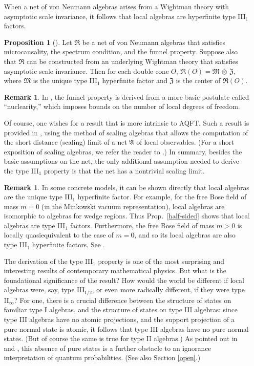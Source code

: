 \documentclass[11pt]{article}
\newcommand{\alg}[1]{\mathfrak{#1}}
\theoremstyle{definition}
\newtheorem{prop}[thm]{Proposition}
\theoremstyle{definition}
\newtheorem{note}[thm]{Remark}
\theoremstyle{remark}
\def\al#1{{\mathfrak #1}}
\begin{document}
When a net of von Neumann algebras arises from a Wightman theory with
asymptotic scale invariance, it follows that local algebras are
hyperfinite type III$_1$ factors.

\begin{prop}[\cite{typeIII}] Let $\al R$ be a net of von Neumann
  algebras that satisfies microcausality, the spectrum condition, and
  the funnel property.  Suppose also that $\al R$ can be constructed
  from an underlying Wightman theory that satisfies asymptotic scale
  invariance.  Then for each double cone $O$, $\al R (O)=\al
  M\,\overline{\otimes}\,\al Z$, where $\al M$ is the unique type
  III$_1$ hyperfinite factor and $\al Z$ is the center of $\al R(O)$.
\end{prop}

\begin{note} In \cite{typeIII}, the funnel property is derived from a
  more basic postulate called ``nuclearity,'' which imposes bounds on
  the number of local degrees of freedom.  \end{note}

Of course, one wishes for a result that is more intrinsic to AQFT.
Such a result is provided in \cite{scaling}, using the method of
scaling algebras that allows the computation of the short distance
(scaling) limit of a net $\alg{A}$ of local observables.  (For a short
exposition of scaling algebras, we refer the reader to \cite{bucky}.)
In summary, besides the basic assumptions on the net, the only
additional assumption needed to derive the type III$_1$ property is
that the net has a nontrivial scaling limit.

\begin{note} In some concrete models, it can be shown directly that
  local algebras are the unique type III$_1$ hyperfinite factor.  For
  example, for the free Bose field of mass $m=0$ (in the Minkowski
  vacuum representation), local algebras are isomorphic to algebras
  for wedge regions.  Thus Prop.\ \ref{half-sided} shows that local
  algebras are type III$_1$ factors.  Furthermore, the free Bose field
  of mass $m>0$ is locally quasiequivalent to the case of $m=0$, and
  so its local algebras are also type III$_1$ hyperfinite factors.
  See \cite[p.\ 254]{horuzhy}.
\end{note}

The derivation of the type III$_1$ property is one of the most
surprising and interesting results of contemporary mathematical
physics.  But what is the foundational significance of the result?
How would the world be different if local algebras were, say, type
III$_{1/2}$, or even more radically different, if they were type
II$_\infty$?  For one, there is a crucial difference between the
structure of states on familiar type I algebras, and the structure of
states on type III algebras: since type III algebras have no atomic
projections, and the support projection of a pure normal state is
atomic, it follows that type III algebras have no pure normal states.
(But of course the same is true for type II algebras.)  As pointed out
in \cite{clif} and \cite{rut}, this absence of pure states is a
further obstacle to an ignorance interpretation of quantum
probabilities.  (See also Section \ref{open}.)  
\end{document}

